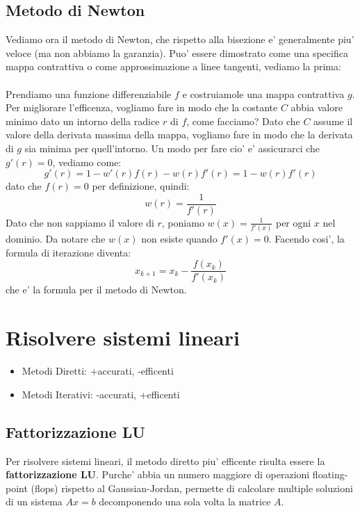 \subsection{Metodo di Newton}
Vediamo ora il metodo di Newton, che rispetto alla bisezione e' generalmente piu' veloce (ma non abbiamo la garanzia). Puo' essere dimostrato come una specifica mappa contrattiva o come approssimazione a linee tangenti, vediamo la prima:\\\\
Prendiamo una funzione differenziabile $ f $ e costruiamole una mappa contrattiva $ g $. Per migliorare l'efficenza, vogliamo fare in modo che la costante $ C $ abbia valore minimo dato un intorno della radice $ r $ di $ f $, come facciamo? Dato che $ C $ assume il valore della derivata massima della mappa, vogliamo fare in modo che la derivata di $ g $ sia minima per quell'intorno. Un modo per fare cio' e' assicurarci che $ g'(r) = 0 $, vediamo come:
\[
  g'(r) = 1 - w'(r)f(r) - w(r)f'(r) = 1 - w(r)f'(r)
\]
dato che $ f(r) = 0 $ per definizione, quindi:
\[
  w(r) = \frac{1}{f'(r)}
\]
Dato che non sappiamo il valore di $ r $, poniamo $ w(x) = \frac{1}{f'(x)} $ per ogni $ x $ nel dominio. Da notare che $ w(x) $ non esiste quando $ f'(x) = 0 $. Facendo cosi', la formula di iterazione diventa:
\[
  x_{k+1} = x_k - \frac{f(x_k)}{f'(x_k)}
\]
che e' la formula per il metodo di Newton.
\section{Risolvere sistemi lineari}
\begin{itemize}
\item Metodi Diretti: +accurati, -efficenti
\item Metodi Iterativi: -accurati, +efficenti
\end{itemize}

\subsection{Fattorizzazione LU}
Per risolvere sistemi lineari, il metodo diretto piu' efficente risulta essere la \textbf{fattorizzazione LU}. Purche' abbia un numero maggiore di operazioni floating-point (flops) rispetto al Gaussian-Jordan, permette di calcolare multiple soluzioni di un sistema $ Ax = b $ decomponendo una sola volta la matrice $ A $. 

